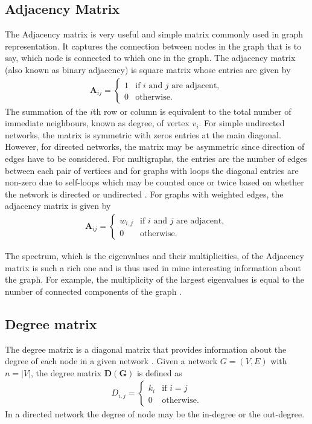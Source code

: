 \documentclass[10pt,a4paper]{article}
\theoremstyle{plain}
\theoremstyle{definition}
\begin{document}
\subsection{Adjacency Matrix}
The Adjacency matrix is very useful and simple matrix commonly used in graph representation. It captures the connection between nodes in the graph that is to say, which node is connected to which one in the graph. The adjacency matrix (also known as binary adjacency) is square matrix whose entries are given by
\begin{eqnarray}
\mathbf{A}_{ij} = \begin{cases} 1 &\mbox{if } i \text{ and } j \text{ are adjacent}, \\
0 & \text{otherwise}.
\end{cases}
\end{eqnarray}
The summation of the $i$th row or column is equivalent to the total number of immediate neighbours, known as degree, of  vertex $v_i$. For simple undirected networks, the matrix is symmetric with zeros entries at the main diagonal. However, for directed networks, the matrix may be asymmetric since direction of edges have to be considered. For multigraphs, the entries  are the number of edges between each pair of vertices and for graphs with loops the diagonal entries are non-zero due to self-loops which may be counted once or twice based on whether the network is directed or undirected \citep{biggs1993algebraic,godsil2001algebraic}. For graphs with weighted edges, the adjacency matrix is given by 
\begin{eqnarray}
\mathbf{A}_{ij} = \begin{cases} w_{i,j} &\mbox{if } i \text{ and } j \text{ are adjacent}, \\
0 & \text{otherwise}.
\end{cases}
\end{eqnarray}


The spectrum, which is the eigenvalues and their multiplicities, of the Adjacency matrix is such a rich one and is thus used in mine interesting information about the graph. For example, the multiplicity of the largest eigenvalues is equal to the number of connected components of the graph \citep{cvetkovic2004spectral}. 

\subsection{Degree matrix}
	The degree matrix is a diagonal matrix that provides information about the degree of each node in a given network \citep{newman2010networks}. Given a network $G=(V,E)$ with $n=|V|$, the degree matrix $\mathbf{D(G)}$ is defined as
	\begin{eqnarray}
	D_{i,j} =  \begin{cases} k_i &\mbox{if } i = j \\
	0 & \text{otherwise}.
	\end{cases}
	\end{eqnarray}
	In a directed network the degree of node may be the in-degree or the out-degree.
\end{document}
